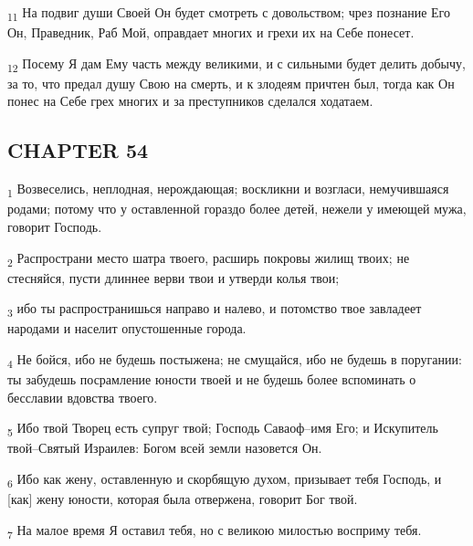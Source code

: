 \begin{tcolorbox}
\textsubscript{11} На подвиг души Своей Он будет смотреть с довольством; чрез познание Его Он, Праведник, Раб Мой, оправдает многих и грехи их на Себе понесет.
\end{tcolorbox}
\begin{tcolorbox}
\textsubscript{12} Посему Я дам Ему часть между великими, и с сильными будет делить добычу, за то, что предал душу Свою на смерть, и к злодеям причтен был, тогда как Он понес на Себе грех многих и за преступников сделался ходатаем.
\end{tcolorbox}
\subsection{CHAPTER 54}
\begin{tcolorbox}
\textsubscript{1} Возвеселись, неплодная, нерождающая; воскликни и возгласи, немучившаяся родами; потому что у оставленной гораздо более детей, нежели у имеющей мужа, говорит Господь.
\end{tcolorbox}
\begin{tcolorbox}
\textsubscript{2} Распространи место шатра твоего, расширь покровы жилищ твоих; не стесняйся, пусти длиннее верви твои и утверди колья твои;
\end{tcolorbox}
\begin{tcolorbox}
\textsubscript{3} ибо ты распространишься направо и налево, и потомство твое завладеет народами и населит опустошенные города.
\end{tcolorbox}
\begin{tcolorbox}
\textsubscript{4} Не бойся, ибо не будешь постыжена; не смущайся, ибо не будешь в поругании: ты забудешь посрамление юности твоей и не будешь более вспоминать о бесславии вдовства твоего.
\end{tcolorbox}
\begin{tcolorbox}
\textsubscript{5} Ибо твой Творец есть супруг твой; Господь Саваоф--имя Его; и Искупитель твой--Святый Израилев: Богом всей земли назовется Он.
\end{tcolorbox}
\begin{tcolorbox}
\textsubscript{6} Ибо как жену, оставленную и скорбящую духом, призывает тебя Господь, и [как] жену юности, которая была отвержена, говорит Бог твой.
\end{tcolorbox}
\begin{tcolorbox}
\textsubscript{7} На малое время Я оставил тебя, но с великою милостью восприму тебя.
\end{tcolorbox}
